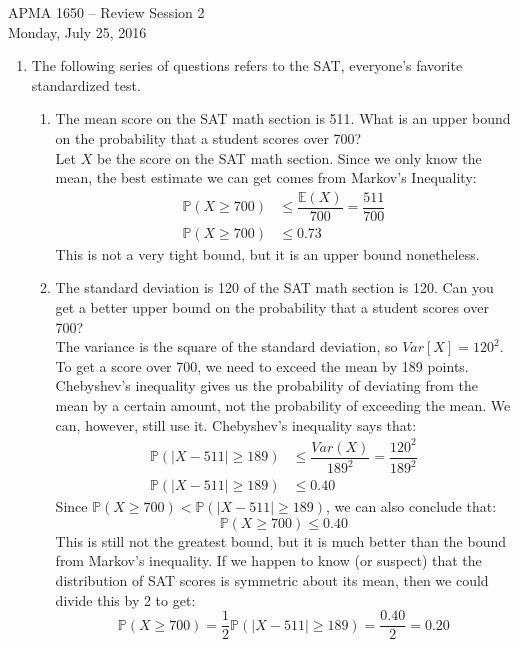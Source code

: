 \documentclass[12pt]{article}
\def\E{{\mathbb E}}
\begin{document}
\title{}
\author{\vspace{-10ex} }

\begin{center}
{\LARGE APMA 1650 -- Review Session 2}\\
\vspace{5mm}
{\large Monday, July 25, 2016}\\
\end{center}

\begin{enumerate}

\item The following series of questions refers to the SAT, everyone's favorite standardized test.
\begin{enumerate}
\item The mean score on the SAT math section is 511. What is an upper bound on the probability that a student scores over 700? \\

Let $X$ be the score on the SAT math section. Since we only know the mean, the best estimate we can get comes from Markov's Inequality:
\begin{align*}
\mathbb{P}(X \geq 700) &\leq  \dfrac{\E(X)}{700} = \dfrac{511}{700} \\
\mathbb{P}(X \geq 700) &\leq 0.73
\end{align*}
This is not a very tight bound, but it is an upper bound nonetheless.

\item The standard deviation is 120 of the SAT math section is 120. Can you get a better upper bound on the probability that a student scores over 700?\\

The variance is the square of the standard deviation, so $Var[X] = 120^2$. To get a score over 700, we need to exceed the mean by 189 points. Chebyshev's inequality gives us the probability of deviating from the mean by a certain amount, not the probability of exceeding the mean. We can, however, still use it. Chebyshev's inequality says that:
\begin{align*}
\mathbb{P}( | X - 511 |  \geq 189) &\leq \dfrac{Var(X)}{189^2} = \dfrac{120^2}{189^2} \\
\mathbb{P}( | X - 511 |  \geq 189) &\leq 0.40
\end{align*}
Since $\mathbb{P}(X \geq 700) < \mathbb{P}( | X - 511 |  \geq 189)$, we can also conclude that:
\[
\mathbb{P}(X \geq 700) \leq 0.40
\]
This is still not the greatest bound, but it is much better than the bound from Markov's inequality. If we happen to know (or suspect) that the distribution of SAT scores is symmetric about its mean, then we could divide this by 2 to get:
\[
\mathbb{P}(X \geq 700) = \frac{1}{2} \mathbb{P}( | X - 511 |  \geq 189) = \frac{0.40}{2} = 0.20
\]


\end{enumerate}
\end{enumerate}
\end{document}
